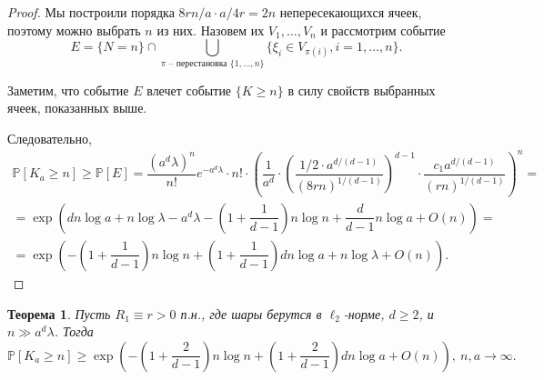 \documentclass[12pt]{article}
\theoremstyle{plain}
\newtheorem{thm}{Теорема} %
\theoremstyle{definition}
\theoremstyle{remark}
\def\geq{\geqslant}
\newcommand{\PP}{\mathbb{P}}
\begin{document}
\begin{proof}
    
    Мы построили порядка $8rn/a \cdot a/4r = 2n$ непересекающихся ячеек, поэтому можно выбрать $n$ из них. Назовем их $V_1, \ldots, V_n$  и рассмотрим событие $$E = \{N=n\}\cap \bigcup\limits_{\pi \text{ -- перестановка } \{1, \ldots, n\}} \{\xi_i \in V_{\pi(i)}, i = 1, \ldots, n\}.$$
                         
    Заметим, что событие $E$ влечет событие $\{K \geq n\}$ в силу свойств выбранных ячеек, показанных выше.
  
    Следовательно, 
    \begin{multline*}
        \PP[K_a\geq n] \geq \PP[E] = \dfrac{(a^d\lambda)^n}{n!}e^{-a^d\lambda}\cdot n!\cdot \left(\dfrac{1}{a^d}\cdot\left(\dfrac{1/2\cdot a^{d/(d-1)}}{(8rn)^{1/(d-1)}}\right)^{d-1}\cdot \dfrac{c_1a^{d/(d-1)}}{(rn)^{1/(d-1)}}\right)^n = \\
        =\exp\left(dn\log a + n\log\lambda - a^d\lambda - \left(1+\dfrac{1}{d-1}\right)n\log n + \dfrac{d}{d-1} n\log a  + O(n)\right) =\\
        =\exp\left(-\left(1 + \dfrac{1}{d-1}\right)n\log n + \left(1 + \dfrac{1}{d-1}\right)dn\log a + n\log\lambda + O(n)\right).
    \end{multline*}{}
\end{proof}{}

\begin{thm}
Пусть $R_1\equiv r > 0$ п.н., где шары берутся в $\ell_2$-норме, $d\geq 2$, и $n \gg a^d\lambda$. 
Тогда $$\PP[K_a \geq n] \geq \exp \left(-\left(1+\dfrac{2}{d-1}\right)n\log n + \left(1+\dfrac{2}{d-1}\right)dn\log a  + O(n)\right),\  n, a\to \infty.$$
\end{thm}{}
\end{document}

